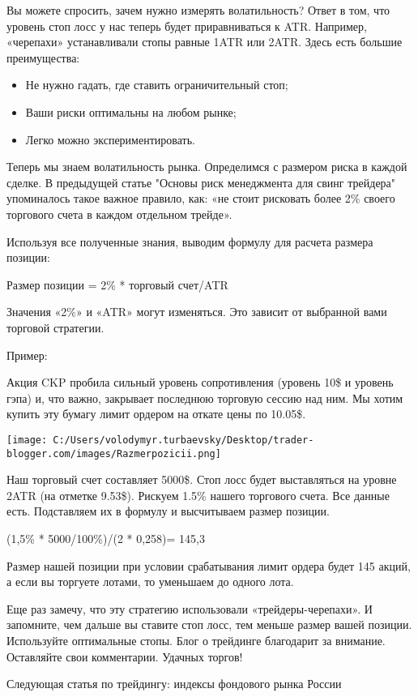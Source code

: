 \documentclass[a5paper]{article}
\begin{document}
Вы можете спросить, зачем нужно измерять волатильность? Ответ в том, что уровень стоп лосс у нас теперь будет приравниваться к ATR. Например, «черепахи» устанавливали стопы равные 1ATR или 2ATR. Здесь есть большие преимущества:
\begin{itemize}
\item     Не нужно гадать, где ставить ограничительный стоп;
\item     Ваши риски оптимальны на любом рынке;
\item     Легко можно экспериментировать.
\end{itemize}

Теперь мы знаем волатильность рынка. Определимся с размером риска в каждой сделке. В предыдущей статье "Основы риск менеджмента для свинг трейдера" упоминалось такое важное правило, как: «не стоит рисковать более 2\% своего торгового счета в каждом отдельном трейде».

Используя все полученные знания, выводим формулу для расчета размера позиции:

Размер позиции = 2\% * торговый счет/ATR

Значения «2\%» и «ATR» могут изменяться. Это зависит от выбранной вами торговой стратегии.

Пример:

Акция CKP пробила сильный уровень сопротивления (уровень 10\$ и
уровень гэпа) и, что важно, закрывает последнюю торговую сессию над
ним. Мы хотим купить эту бумагу лимит ордером на откате цены по
10.05\$.

\texttt{[image: C:/Users/volodymyr.turbaevsky/Desktop/trader-blogger.com/images/Razmerpozicii.png]}

Наш торговый счет составляет 5000\$. Стоп лосс будет выставляться на уровне 2ATR (на отметке 9.53\$). Рискуем 1.5\% нашего торгового счета. Все данные есть. Подставляем их в формулу и высчитываем размер позиции.

(1,5\% * 5000/100\%)/(2 * 0,258)= 145,3

Размер нашей позиции при условии срабатывания лимит ордера будет 145 акций, а если вы торгуете лотами, то уменьшаем до одного лота.

Еще раз замечу, что эту стратегию использовали «трейдеры-черепахи». И запомните, чем дальше вы ставите стоп лосс, тем меньше размер вашей позиции. Используйте оптимальные стопы. Блог о трейдинге благодарит за внимание. Оставляйте свои комментарии. Удачных торгов!


Следующая статья по трейдингу: индексы фондового рынка России
\end{document}
